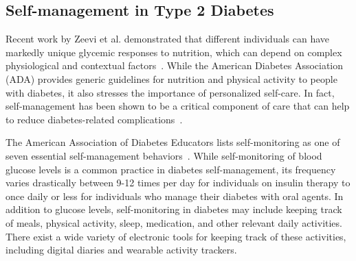 \documentclass[10pt,letterpaper]{article}
\begin{document}


\subsection{Self-management in Type 2 Diabetes}
Recent work by Zeevi et al. demonstrated that different individuals can have markedly unique glycemic responses to nutrition, which can depend on complex physiological and contextual factors~\cite{zeevi_personalized_2015}. While the American Diabetes Association (ADA) provides generic guidelines for nutrition and physical activity to people with diabetes, it also stresses the importance of personalized self-care. In fact, self-management has been shown to be a critical component of care that can help to reduce diabetes-related complications~\cite{AADE,khattab_factors_2010}.

The American Association of Diabetes Educators lists self-monitoring as one of seven essential self-management behaviors~\cite{AADE}.
While self-monitoring of blood glucose levels is a common practice in diabetes self-management, its frequency varies drastically between 9-12 times per day for individuals on insulin therapy to once daily or less for individuals who manage their diabetes with oral agents. In addition to glucose levels, self-monitoring in diabetes may include keeping track of meals, physical activity, sleep, medication, and other relevant daily activities. There exist a wide variety of electronic tools for keeping track of these activities, including digital diaries and wearable activity trackers.
\end{document}

